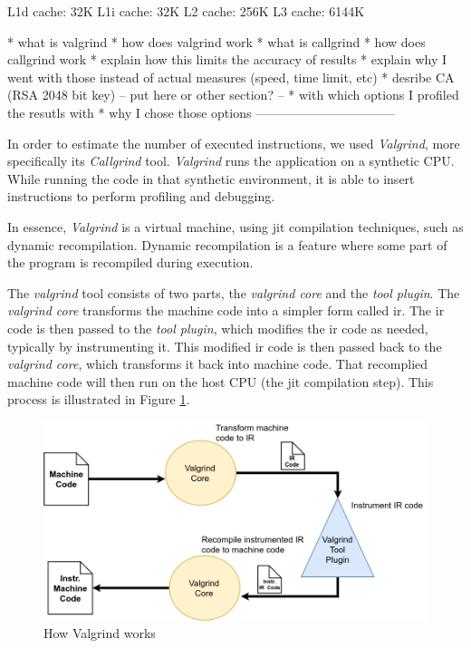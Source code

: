 \documentclass{llncs}
\begin{document}
L1d cache:           32K
L1i cache:           32K
L2 cache:            256K
L3 cache:            6144K

* what is valgrind
* how does valgrind work
* what is callgrind
* how does callgrind work
* explain how this limits the accuracy of results
* explain why I went with those instead of actual measures (speed, time limit, etc)
* desribe CA (RSA 2048 bit key)
-- put here or other section? --
* with which options I profiled the resutls with
* why I chose those options
---------------------------------

In order to estimate the number of executed instructions, we used \textit{Valgrind}, more specifically
    its \textit{Callgrind} tool. \textit{Valgrind} runs the application on a synthetic CPU. 
While running the code in that synthetic environment, it is able to insert instructions to perform
profiling and debugging. 

In essence, \textit{Valgrind} is a virtual machine, using \gls{jit}
compilation techniques, such as dynamic recompilation. Dynamic recompilation is a
feature where some part of the program is recompiled during execution.

The \textit{valgrind} tool consists of two parts, the \textit{valgrind core} and the \textit{tool
plugin}. The \textit{valgrind core} transforms the machine code into a simpler form called
\gls{ir}. The \gls{ir} code is then passed to the \textit{tool plugin}, which modifies the
\gls{ir} code as needed, typically by instrumenting it. This modified \gls{ir} code is then passed back to the 
\textit{valgrind core}, which transforms it back into machine code. That recomplied machine code  will then run on the
host CPU (the \gls{jit} compilation step). This process is illustrated in Figure \ref{fig:how_valgrind_works}.

\begin{figure}
  \centering
  \includegraphics[width=1.0\textwidth]{img/how_valgrind_works.png}
  \caption{\label{fig:how_valgrind_works} How Valgrind works}
\end{figure}
\end{document}
